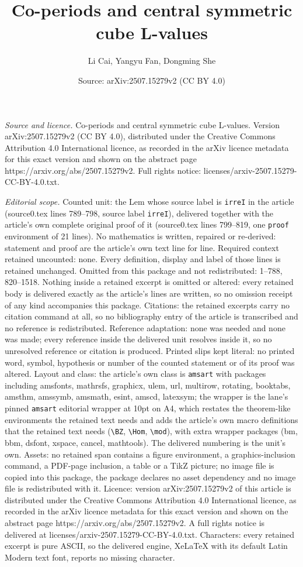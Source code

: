 \documentclass[10pt,a4paper]{amsart}
\title[Co-periods and central symmetric cube L-values]{Co-periods and central symmetric cube L-values}
\author{Li Cai, Yangyu Fan, Dongming She}
\date{Source: arXiv:2507.15279v2 (CC BY 4.0)}
\begin{document}
\maketitle

\noindent\emph{Source and licence.} Co-periods and central symmetric cube L-values. Version arXiv:2507.15279v2 (CC BY 4.0), distributed under the Creative Commons Attribution 4.0 International licence, as recorded in the arXiv licence metadata for this exact version and shown on the abstract page https://arxiv.org/abs/2507.15279v2. Full rights notice: licenses/arxiv-2507.15279-CC-BY-4.0.txt.\par\smallskip

\noindent\textit{Editorial scope.} Counted unit: the Lem whose source label is \texttt{irreI} in the article (source0.tex lines 789--798, source label \texttt{irreI}), delivered together with the article's own complete original proof of it (source0.tex lines 799--819, one \texttt{proof} environment of 21 lines). No mathematics is written, repaired or re-derived: statement and proof are the article's own text line for line. Required context retained uncounted: none. Every definition, display and label of those lines is retained unchanged. Omitted from this package and not redistributed: 1--788, 820--1518. Nothing inside a retained excerpt is omitted or altered: every retained body is delivered exactly as the article's lines are written, so no omission receipt of any kind accompanies this package. Citations: the retained excerpts carry no citation command at all, so no bibliography entry of the article is transcribed and no reference is redistributed. Reference adaptation: none was needed and none was made; every reference inside the delivered unit resolves inside it, so no unresolved reference or citation is produced. Printed slips kept literal: no printed word, symbol, hypothesis or number of the counted statement or of its proof was altered. Layout and class: the article's own class is \texttt{amsart} with packages including amsfonts, mathrsfs, graphicx, ulem, url, multirow, rotating, booktabs, amsthm, amssymb, amsmath, esint, amscd, latexsym; the wrapper is the lane's pinned \texttt{amsart} editorial wrapper at 10pt on A4, which restates the theorem-like environments the retained text needs and adds the article's own macro definitions that the retained text needs (\texttt{\textbackslash BZ}, \texttt{\textbackslash Hom}, \texttt{\textbackslash mod}), with extra wrapper packages (bm, bbm, dsfont, xspace, cancel, mathtools). The delivered numbering is the unit's own. Assets: no retained span contains a figure environment, a graphics-inclusion command, a PDF-page inclusion, a table or a TikZ picture; no image file is copied into this package, the package declares no asset dependency and no image file is redistributed with it. Licence: version arXiv:2507.15279v2 of this article is distributed under the Creative Commons Attribution 4.0 International licence, as recorded in the arXiv licence metadata for this exact version and shown on the abstract page https://arxiv.org/abs/2507.15279v2. A full rights notice is delivered at licenses/arxiv-2507.15279-CC-BY-4.0.txt. Characters: every retained excerpt is pure ASCII, so the delivered engine, XeLaTeX with its default Latin Modern text font, reports no missing character.
\end{document}
